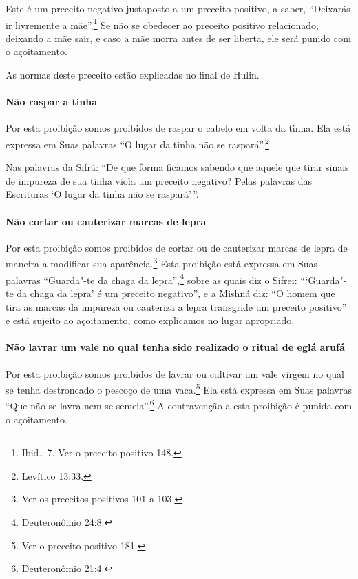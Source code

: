 \begin{multicols}{2}
Este é um preceito negativo justaposto a um preceito positivo, a saber,
``Deixarás ir livremente a mãe''.\footnote{Ibid., 7. Ver o preceito positivo 148.} Se não
se obedecer ao preceito positivo relacionado, deixando a mãe sair, e caso a mãe morra antes de ser liberta, ele será punido com o açoitamento.

As normas deste preceito estão explicadas no final de Hulin\starr.

\paragraph{Não raspar a tinha}

Por esta proibição somos proibidos de raspar o cabelo em volta da tinha.
Ela está expressa em Suas palavras ``O lugar da tinha não se raspará''.\footnote{Levítico 13:33.}

Nas palavras da Sifrá\starr: ``De que forma ficamos sabendo que aquele que
tirar sinais de impureza de sua tinha viola um preceito negativo? Pelas
palavras das Escrituras `O lugar da tinha não se raspará'\,''.

\paragraph{Não cortar ou cauterizar marcas de lepra}

Por esta proibição somos proibidos de cortar ou de cauterizar marcas de lepra de maneira a modificar sua aparência.\footnote{Ver os preceitos positivos 101 a 103.}
Esta proibição está expressa em Suas palavras ``Guarda"-te da chaga da
lepra'',\footnote{Deuteronômio 24:8.} sobre as quais diz o Sifrei\starr: ```Guarda"-te
da chaga da lepra' é um preceito negativo'', e a Mishná\starr{} diz: ``O homem
que tira as marcas da impureza ou cauteriza a lepra transgride um
preceito positivo'' e está sujeito ao açoitamento, como explicamos no
lugar apropriado.

\paragraph{Não lavrar um vale no qual tenha sido realizado o ritual de eglá arufá\starr}

Por esta proibição somos proibidos de lavrar ou cultivar um vale virgem
no qual se tenha destroncado o pescoço de uma
vaca.\footnote{Ver o preceito positivo 181.} Ela está expressa em Suas palavras ``Que
não se lavra nem se semeia''.\footnote{Deuteronômio 21:4.} A contravenção a esta
proibição é punida com o açoitamento.


\end{multicols}
